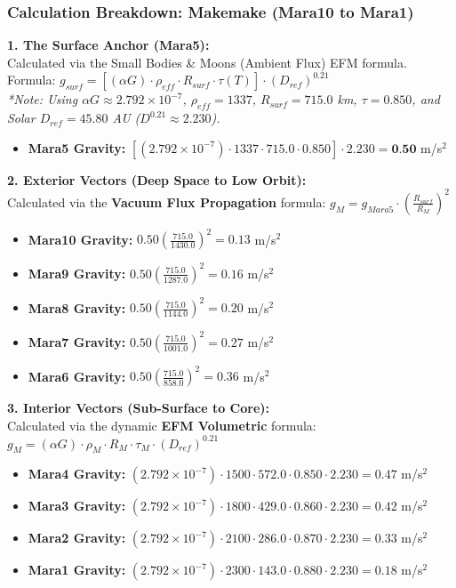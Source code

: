 \documentclass[11pt, a4paper]{article}
\begin{document}
\clearpage
\subsubsection{Calculation Breakdown: Makemake (Mara10 to Mara1)}

\noindent \textbf{1. The Surface Anchor (Mara5):} \\
Calculated via the Small Bodies \& Moons (Ambient Flux) EFM formula. \\
Formula: $g_{surf} = \left[ (\alpha G) \cdot \rho_{eff} \cdot R_{surf} \cdot \tau(T) \right] \cdot (D_{ref})^{0.21}$ \\
\textit{*Note: Using $\alpha G \approx 2.792 \times 10^{-7}$, $\rho_{eff} = 1337$, $R_{surf} = 715.0$ km, $\tau = 0.850$, and Solar $D_{ref} = 45.80$ AU ($D^{0.21} \approx 2.230$).}
\begin{itemize}
  \item \textbf{Mara5 Gravity:} $\left[ (2.792 \times 10^{-7}) \cdot 1337 \cdot 715.0 \cdot 0.850 \right] \cdot 2.230 = \textbf{0.50}$ m/s$^2$
\end{itemize}

\vspace{0.5em}
\noindent \textbf{2. Exterior Vectors (Deep Space to Low Orbit):} \\
Calculated via the \textbf{Vacuum Flux Propagation} formula: $g_M = g_{Mara5} \cdot \left( \frac{R_{surf}}{R_M} \right)^2$
\begin{itemize}
  \item \textbf{Mara10 Gravity:} $0.50 \left( \frac{715.0}{1430.0} \right)^2 = 0.13$ m/s$^2$
  \item \textbf{Mara9 Gravity:} $0.50 \left( \frac{715.0}{1287.0} \right)^2 = 0.16$ m/s$^2$
  \item \textbf{Mara8 Gravity:} $0.50 \left( \frac{715.0}{1144.0} \right)^2 = 0.20$ m/s$^2$
  \item \textbf{Mara7 Gravity:} $0.50 \left( \frac{715.0}{1001.0} \right)^2 = 0.27$ m/s$^2$
  \item \textbf{Mara6 Gravity:} $0.50 \left( \frac{715.0}{858.0} \right)^2 = 0.36$ m/s$^2$
\end{itemize}

\vspace{0.5em}
\noindent \textbf{3. Interior Vectors (Sub-Surface to Core):} \\
Calculated via the dynamic \textbf{EFM Volumetric} formula: $g_M = (\alpha G) \cdot \rho_{M} \cdot R_M \cdot \tau_M \cdot (D_{ref})^{0.21}$
\begin{itemize}
  \item \textbf{Mara4 Gravity:} $(2.792 \times 10^{-7}) \cdot 1500 \cdot 572.0 \cdot 0.850 \cdot 2.230 = 0.47$ m/s$^2$
  \item \textbf{Mara3 Gravity:} $(2.792 \times 10^{-7}) \cdot 1800 \cdot 429.0 \cdot 0.860 \cdot 2.230 = 0.42$ m/s$^2$
  \item \textbf{Mara2 Gravity:} $(2.792 \times 10^{-7}) \cdot 2100 \cdot 286.0 \cdot 0.870 \cdot 2.230 = 0.33$ m/s$^2$
  \item \textbf{Mara1 Gravity:} $(2.792 \times 10^{-7}) \cdot 2300 \cdot 143.0 \cdot 0.880 \cdot 2.230 = 0.18$ m/s$^2$
\end{itemize}
\end{document}
